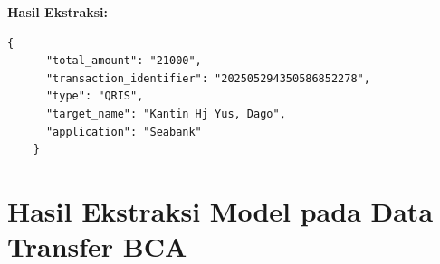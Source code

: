 \textbf{Hasil Ekstraksi:}
\begin{lstlisting}[style=jsonstyle]
    {
      "total_amount": "21000",
      "transaction_identifier": "202505294350586852278",
      "type": "QRIS",
      "target_name": "Kantin Hj Yus, Dago",
      "application": "Seabank"
    }
\end{lstlisting}

\clearpage

\section{Hasil Ekstraksi Model pada Data Transfer BCA}

\begin{table}[h!]
    \centering
    \begin{tabularx}{\textwidth}{m{} X}

\end{tabularx}
\end{table}
